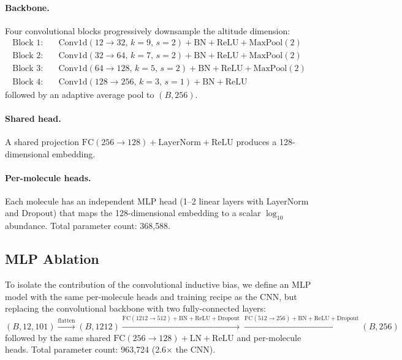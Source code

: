\documentclass[11pt]{article}
\begin{document}
\paragraph{Backbone.} Four convolutional blocks progressively downsample the
altitude dimension:
\begin{align*}
  \text{Block 1:} &\quad \text{Conv1d}(12{\to}32,\,k{=}9,\,s{=}2) + \text{BN} + \text{ReLU} + \text{MaxPool}(2) \\
  \text{Block 2:} &\quad \text{Conv1d}(32{\to}64,\,k{=}7,\,s{=}2) + \text{BN} + \text{ReLU} + \text{MaxPool}(2) \\
  \text{Block 3:} &\quad \text{Conv1d}(64{\to}128,\,k{=}5,\,s{=}2) + \text{BN} + \text{ReLU} + \text{MaxPool}(2) \\
  \text{Block 4:} &\quad \text{Conv1d}(128{\to}256,\,k{=}3,\,s{=}1) + \text{BN} + \text{ReLU}
\end{align*}
followed by an adaptive average pool to $(B, 256)$.

\paragraph{Shared head.} A shared projection $\text{FC}(256{\to}128) +
\text{LayerNorm} + \text{ReLU}$ produces a 128-dimensional embedding.

\paragraph{Per-molecule heads.} Each molecule has an independent MLP head
(1--2 linear layers with LayerNorm and Dropout) that maps the 128-dimensional
embedding to a scalar $\log_{10}$ abundance. Total parameter count: 368{,}588.

\subsection{MLP Ablation}
\label{sec:mlp}

To isolate the contribution of the convolutional inductive bias, we define an
MLP model with the same per-molecule heads and training recipe as the CNN, but
replacing the convolutional backbone with two fully-connected layers:
\[
  (B,12,101) \xrightarrow{\text{flatten}} (B,1212)
  \xrightarrow{\text{FC}(1212{\to}512)+\text{BN}+\text{ReLU}+\text{Dropout}}
  \xrightarrow{\text{FC}(512{\to}256)+\text{BN}+\text{ReLU}+\text{Dropout}}
  (B,256)
\]
followed by the same shared $\text{FC}(256{\to}128) + \text{LN} + \text{ReLU}$
and per-molecule heads. Total parameter count: 963{,}724 (2.6$\times$ the CNN).
\end{document}

